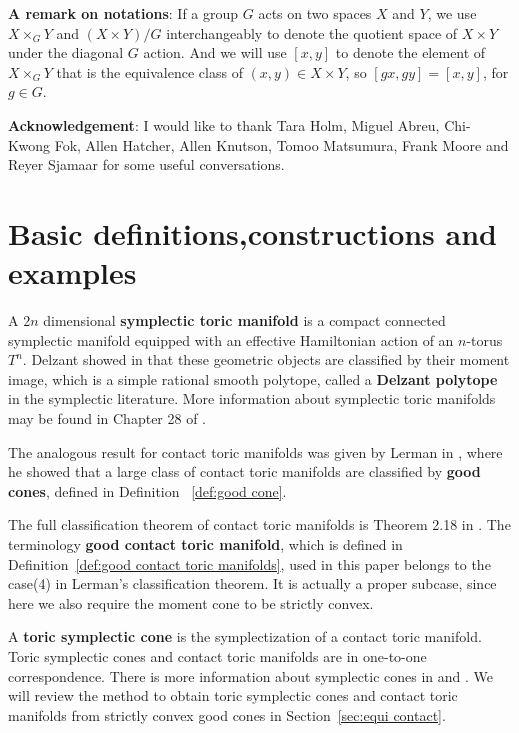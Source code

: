 \documentclass[12pt]{amsart}
\theoremstyle{definition}
\numberwithin{equation}{section}
\begin{document}
{\bf A remark on notations}: If a group $G$ acts on two spaces $X$
and $Y$, we use $X\times_{G} Y$ and $(X\times Y)/G$ interchangeably
to denote the quotient space of $X\times Y$ under the diagonal $G$
action. And we will use $[x,y]$ to denote the element of
$X\times_{G}Y$ that is the equivalence class of $(x,y)\in X\times
Y$, so $[gx, gy]=[x,y]$, for $g\in G$.

{\bf Acknowledgement}: I would like to thank Tara Holm, Miguel
Abreu, Chi-Kwong Fok, Allen Hatcher, Allen Knutson, Tomoo Matsumura,
Frank Moore and Reyer Sjamaar for some useful conversations.

\section{\bf Basic definitions,constructions and examples}\label{sec:basic con}

A $2n$ dimensional {\bf symplectic toric manifold} is a compact
connected symplectic manifold equipped with an effective Hamiltonian
action of an $n$-torus $T^n$. Delzant showed in \cite{Delzant} that
these geometric objects are classified by their moment image, which
is a simple rational smooth polytope, called a {\bf Delzant
polytope} in the symplectic literature. More information about
symplectic toric manifolds may be found in Chapter 28 of
\cite{CdS:book}.

The analogous result for contact toric manifolds was given by Lerman
in \cite{L:contact toric}, where he showed that a large class of
contact toric manifolds are classified by {\bf good cones}, defined
in Definition ~\ref{def:good cone}.

 The full
classification theorem of contact toric manifolds is Theorem 2.18 in
\cite{L:contact toric}. The terminology {\bf good contact toric
manifold}, which is defined in Definition~\ref{def:good contact
toric manifolds}, used in this paper belongs to the case(4) in
Lerman's classification theorem. It is actually a proper subcase,
since here we also require the moment cone to be strictly convex.

A {\bf toric symplectic cone} is the symplectization of a contact
toric manifold. Toric symplectic cones and contact toric manifolds
are in one-to-one correspondence. There is more information about
symplectic cones in \cite{L:geodesic flows} and \cite{AM:contact
homology}. We will review the method to obtain toric symplectic
cones and contact toric manifolds from strictly convex good cones in
Section~\ref{sec:equi contact}.
\end{document}
